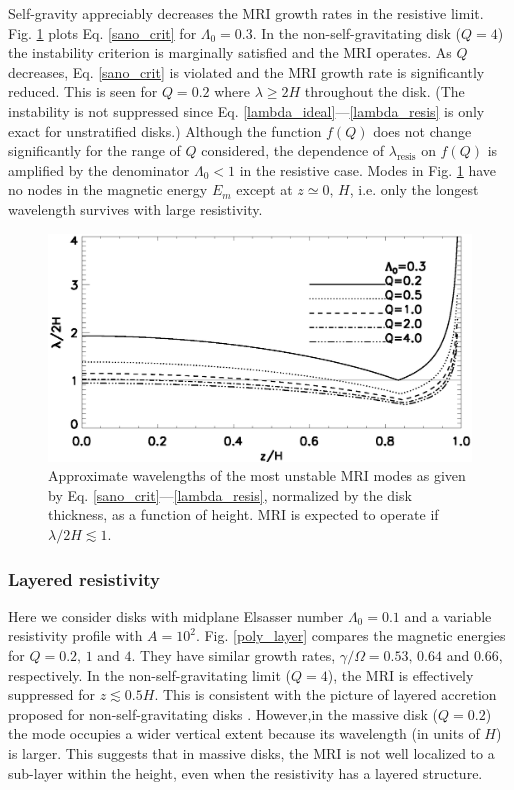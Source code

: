 Self-gravity appreciably decreases the MRI growth rates in the
resistive limit. Fig. \ref{lambda_poly_resis} plots 
Eq. \ref{sano_crit} for $\Lambda_0=0.3$. In the non-self-gravitating
disk ($Q=4$) the instability criterion is marginally satisfied and the
MRI operates. As $Q$ decreases, 
Eq. \ref{sano_crit} is violated and the MRI growth rate is
significantly reduced. This is seen for $Q=0.2$ where $\lambda \geq 2H$ throughout
the disk. (The instability is not suppressed since
Eq. \ref{lambda_ideal}---\ref{lambda_resis} is only exact for
unstratified disks.) Although the function 
$f(Q)$ does not change significantly for the range of $Q$ considered,
the dependence of $\lambda_\mathrm{resis}$ on $f(Q)$ is amplified by the
denominator $\Lambda_0<1$ in the resistive case. Modes in
Fig. \ref{lambda_poly_resis} have no nodes in the magnetic energy
$E_m$ except at $z\simeq0,\,H$, i.e. only the longest wavelength survives
with large resistivity. 

\begin{figure}
  \includegraphics[width=\linewidth]{figures/lambda_poly_uniresis}
  \caption{Approximate wavelengths of the most unstable MRI modes as given by
    Eq. \ref{sano_crit}---\ref{lambda_resis}, normalized by the 
    disk thickness, as a function of height. MRI is expected to
    operate if $\lambda/2H\lesssim 1$. 
    \label{lambda_poly_resis}}
\end{figure}



\subsubsection{Layered 
  resistivity} 
Here we consider disks with midplane Elsasser number $\Lambda_0=0.1$
and a variable resistivity profile with
$A=10^2$. Fig. \ref{poly_layer} compares the magnetic  
energies for $Q=0.2,\,1$ and $4$. They have similar growth rates, $\gamma/\Omega
= 0.53,\,0.64$ and $0.66$, respectively. In the non-self-gravitating
limit ($Q=4$), the MRI is effectively suppressed for
$z\lesssim0.5H$. This is consistent with the picture of layered
accretion proposed for non-self-gravitating disks \citep{gammie96,fleming03}. 
However,in the massive disk ($Q=0.2$) the mode occupies a wider vertical
extent because its wavelength (in units of $H$) is larger. This
suggests that in massive disks, the MRI is not well localized to a
sub-layer within the height, even when the resistivity has a layered
structure.  


